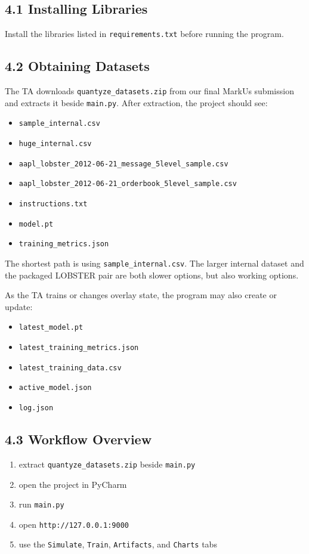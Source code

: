 \documentclass[11pt]{article}
\begin{document}
\subsection*{4.1 Installing Libraries}
Install the libraries listed in \texttt{requirements.txt} before running the
program.

\subsection*{4.2 Obtaining Datasets}
The TA downloads \texttt{quantyze\_datasets.zip} from our final MarkUs
submission and extracts it beside \texttt{main.py}. After extraction, the
project should see:
\begin{itemize}
    \item \texttt{sample\_internal.csv}
    \item \texttt{huge\_internal.csv}
    \item \texttt{aapl\_lobster\_2012-06-21\_message\_5level\_sample.csv}
    \item \texttt{aapl\_lobster\_2012-06-21\_orderbook\_5level\_sample.csv}
    \item \texttt{instructions.txt}
    \item \texttt{model.pt}
    \item \texttt{training\_metrics.json}
\end{itemize}

The shortest path is using \texttt{sample\_internal.csv}. The
larger internal dataset and the packaged LOBSTER pair are both slower
options, but also working options.

As the TA trains or changes overlay state, the program may also create or
update:
\begin{itemize}
    \item \texttt{latest\_model.pt}
    \item \texttt{latest\_training\_metrics.json}
    \item \texttt{latest\_training\_data.csv}
    \item \texttt{active\_model.json}
    \item \texttt{log.json}
\end{itemize}

\subsection*{4.3 Workflow Overview}
\begin{enumerate}
    \item extract \texttt{quantyze\_datasets.zip} beside \texttt{main.py}
    \item open the project in PyCharm
    \item run \texttt{main.py}
    \item open \texttt{http://127.0.0.1:9000}
    \item use the \texttt{Simulate}, \texttt{Train}, \texttt{Artifacts}, and
    \texttt{Charts} tabs
\end{enumerate}
\end{document}
